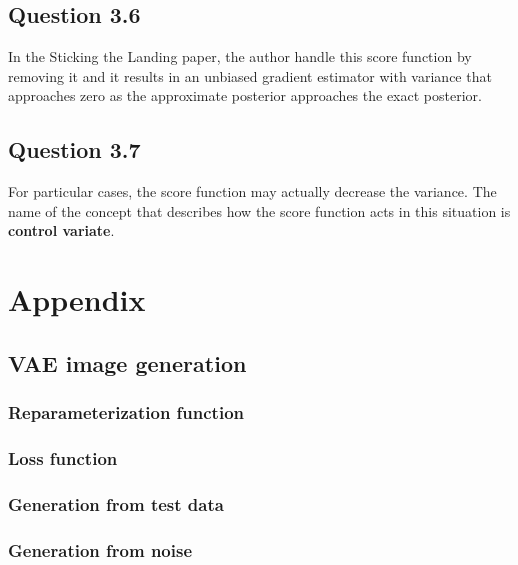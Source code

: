 \documentclass{article}
\begin{document}
\subsection{Question 3.6}
In the Sticking the Landing paper, the author handle this score function by removing it and it results in an unbiased gradient estimator with variance that approaches zero as the approximate posterior approaches the exact posterior.

\subsection{Question 3.7}
For particular cases, the score function may actually decrease the variance. The name of the concept that describes how the score function acts in this situation is \textbf{control variate}.

\newpage
\appendix

\section{Appendix}
\subsection{VAE image generation}\label{appendix:1.2}
\subsubsection{Reparameterization function}\label{appendix:1.2-reparam}

\subsubsection{Loss function}\label{appendix:1.2-loss}

\subsubsection{Generation from test data}\label{appendix:1.2-gen_test}

\subsubsection{Generation from noise}\label{appendix:1.2-gen}

\end{document}
